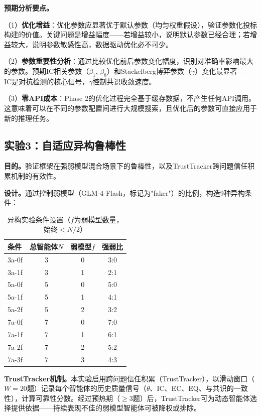 \documentclass[12pt,a4paper,UTF8,fontset=fandol]{ctexart}
\begin{document}
\textbf{预期分析要点。}

（1）\textbf{优化增益}：优化参数应显著优于默认参数（均匀权重假设），验证参数化投标构建的价值。关键问题是增益幅度——若增益较小，说明默认参数已经合理；若增益较大，说明参数敏感性高，数据驱动优化必不可少。

（2）\textbf{参数重要性分析}：通过比较优化前后参数变化幅度，识别对准确率影响最大的参数。预期IC相关参数（$\beta_1$, $\beta_8$）和Stackelberg博弈参数（$\gamma$）变化最显著——IC是对抗检测的核心信号，$\gamma$控制共识收敛速度。

（3）\textbf{零API成本}：Phase 2的优化过程完全基于缓存数据，不产生任何API调用。这意味着可以在不同的参数配置间进行大规模搜索，且优化后的参数可直接应用于新的推理任务。

\subsection{实验3：自适应异构鲁棒性}\label{sec:exp3}

\textbf{目的。}验证框架在强弱模型混合场景下的鲁棒性，以及TrustTracker跨问题信任积累机制的有效性。

\textbf{设计。}通过控制弱模型（GLM-4-Flash，标记为"faker"）的比例，构造9种异构条件：

\begin{table}[H]
\centering
\caption{异构实验条件设置（$f$为弱模型数量，始终$< N/2$）}\label{tab:exp3_cond}
\begin{tabular}{lccc}
\toprule
条件 & 总智能体$N$ & 弱模型$f$ & 强弱比 \\
\midrule
3a-0f & 3 & 0 & 3:0 \\
3a-1f & 3 & 1 & 2:1 \\
5a-0f & 5 & 0 & 5:0 \\
5a-1f & 5 & 1 & 4:1 \\
5a-2f & 5 & 2 & 3:2 \\
7a-0f & 7 & 0 & 7:0 \\
7a-1f & 7 & 1 & 6:1 \\
7a-2f & 7 & 2 & 5:2 \\
7a-3f & 7 & 3 & 4:3 \\
\bottomrule
\end{tabular}
\end{table}

\textbf{TrustTracker机制。}本实验启用跨问题信任积累（TrustTracker），以滑动窗口（$W=20$题）记录每个智能体的历史质量信号（$\theta$、IC、EC、EQ、与共识的一致性），计算可靠性分数。经过预热期（$\geq 3$题）后，TrustTracker可为动态智能体选择提供依据——持续表现不佳的弱模型智能体可被降权或排除。
\end{document}
